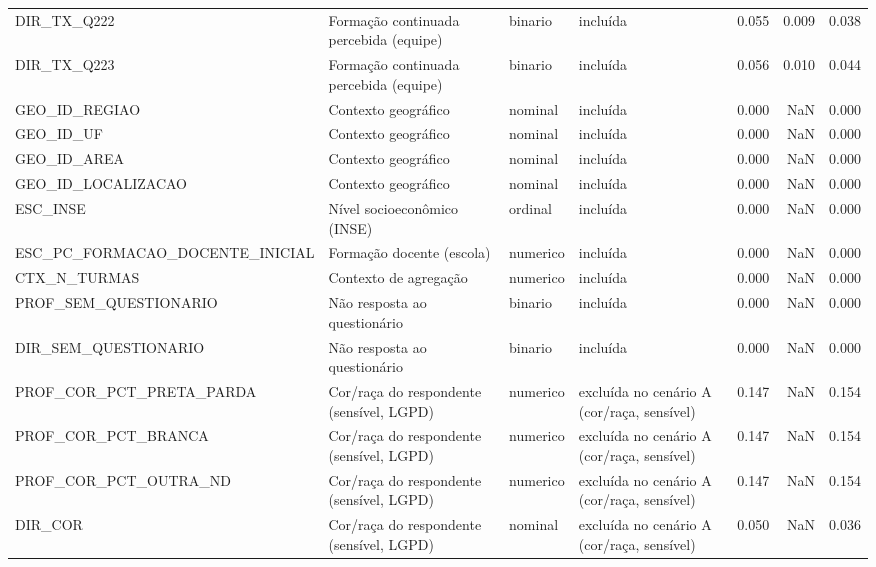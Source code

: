 \begin{tabular}{llllrrr}
DIR\_TX\_Q222 & Formação continuada percebida (equipe) & binario & incluída & 0.055 & 0.009 & 0.038 \\
DIR\_TX\_Q223 & Formação continuada percebida (equipe) & binario & incluída & 0.056 & 0.010 & 0.044 \\
GEO\_ID\_REGIAO & Contexto geográfico & nominal & incluída & 0.000 & NaN & 0.000 \\
GEO\_ID\_UF & Contexto geográfico & nominal & incluída & 0.000 & NaN & 0.000 \\
GEO\_ID\_AREA & Contexto geográfico & nominal & incluída & 0.000 & NaN & 0.000 \\
GEO\_ID\_LOCALIZACAO & Contexto geográfico & nominal & incluída & 0.000 & NaN & 0.000 \\
ESC\_INSE & Nível socioeconômico (INSE) & ordinal & incluída & 0.000 & NaN & 0.000 \\
ESC\_PC\_FORMACAO\_DOCENTE\_INICIAL & Formação docente (escola) & numerico & incluída & 0.000 & NaN & 0.000 \\
CTX\_N\_TURMAS & Contexto de agregação & numerico & incluída & 0.000 & NaN & 0.000 \\
PROF\_SEM\_QUESTIONARIO & Não resposta ao questionário & binario & incluída & 0.000 & NaN & 0.000 \\
DIR\_SEM\_QUESTIONARIO & Não resposta ao questionário & binario & incluída & 0.000 & NaN & 0.000 \\
PROF\_COR\_PCT\_PRETA\_PARDA & Cor/raça do respondente (sensível, LGPD) & numerico & excluída no cenário A (cor/raça, sensível) & 0.147 & NaN & 0.154 \\
PROF\_COR\_PCT\_BRANCA & Cor/raça do respondente (sensível, LGPD) & numerico & excluída no cenário A (cor/raça, sensível) & 0.147 & NaN & 0.154 \\
PROF\_COR\_PCT\_OUTRA\_ND & Cor/raça do respondente (sensível, LGPD) & numerico & excluída no cenário A (cor/raça, sensível) & 0.147 & NaN & 0.154 \\
DIR\_COR & Cor/raça do respondente (sensível, LGPD) & nominal & excluída no cenário A (cor/raça, sensível) & 0.050 & NaN & 0.036 \\
\bottomrule
\end{tabular}
